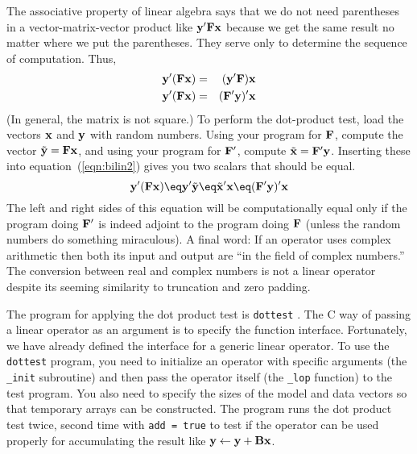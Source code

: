 \par
The associative property of linear algebra says that
we do not need parentheses in a vector-matrix-vector product
like $\bold y' \bold F \bold x $ because we get the same
result no matter where we put the parentheses.
They serve only to determine the
sequence of computation.
Thus,
\begin{eqnarray}
\bold y' ( \bold F \bold x ) &=& ( \bold y' \bold F )  \bold x   \\
\bold y' ( \bold F \bold x ) &=& ( \bold F' \bold y )' \bold x 
\label{eqn:bilin2}
\end{eqnarray}
(In general, the matrix is not square.)
To perform the dot-product test,
load the vectors $\bold x$ and $\bold y$ with random numbers.
Using your program for $\bold F$,
compute the vector $\tilde{\bold{y}} = \bold{F}\bold{x}$,
and using your program for $\bold{F}'$,
compute $\tilde{\bold{x}} = \bold{F}'\bold{y}$.
Inserting these into equation~(\ref{eqn:bilin2})
gives you two scalars that should be equal.
\begin{equation}
\bold{y}' ( \bold F \bold x ) \eq
\bold y' \tilde{\bold y} \eq \tilde{\bold x} ' \bold x
\eq ( \bold F' \bold y )' \bold x
\label{eqn:bilin}
\end{equation}
The left and right sides of this equation will be computationally equal
only if the program doing $\bold F'$ is indeed adjoint
to the program doing $\bold F$
(unless the random numbers do something miraculous).
A final word: If an operator uses complex arithmetic
then both its input and output are ``in the field of complex numbers.''
The conversion between real and complex numbers is not a linear operator
despite its seeming similarity to truncation and zero padding.

\par
The program for applying the dot product test is \texttt{dottest}
. 
The C way of passing a linear operator
as an argument is to specify the function interface. Fortunately, we
have already defined the interface for a generic linear operator. To
use the \texttt{dottest} program, you need to initialize an operator
with specific arguments (the \texttt{\_init} subroutine) and then pass
the operator itself (the \texttt{\_lop} function) to the test program.
You also need to specify the sizes of the model and data vectors so
that temporary arrays can be constructed. The program runs the dot
product test twice, second time with \texttt{add = true} to test if
the operator can be used properly for accumulating the result like
$\bold y \leftarrow \bold y+\bold B\bold x$.


